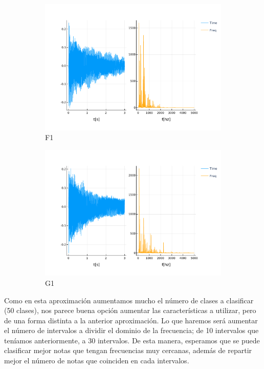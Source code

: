 \documentclass[12pt]{article}
\begin{document}
\begin{figure}[!ht]
	\centering
	\begin{subfigure}{.5\textwidth}
		\centering
		\includegraphics[width=1.0\linewidth]{assets/F1.pdf}
		\caption{F1}
		\label{fig:f1}
	\end{subfigure}%
	\begin{subfigure}{.5\textwidth}
		\centering
		\includegraphics[width=1.0\linewidth]{assets/G1.pdf}
		\caption{G1}
		\label{fig:g1}
	\end{subfigure}
	\caption{}
\end{figure}


Como en esta aproximación aumentamos mucho el número de clases a clasificar (50 clases),
nos parece buena opción aumentar las características a utilizar, pero de una forma
distinta a la anterior aproximación. Lo que haremos será aumentar el número de intervalos
a dividir el dominio de la frecuencia; de 10 intervalos que teníamos anteriormente, a 30 intervalos.
De esta manera, esperamos que se puede clasificar mejor notas que tengan frecuencias muy cercanas,
además de repartir mejor el número de notas que coinciden en cada intervalos.
\end{document}
